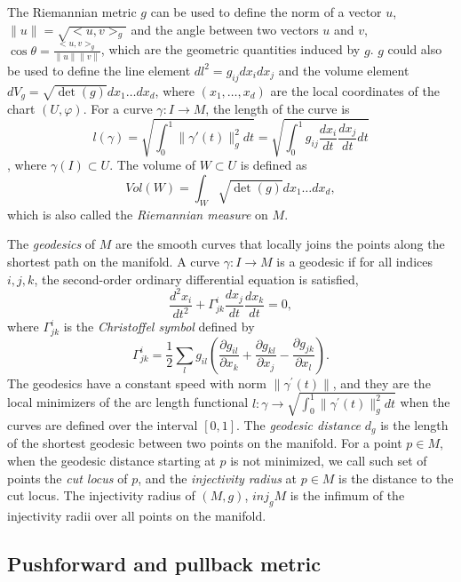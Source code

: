 \documentclass[11pt,a4paper,]{article}
\begin{document}
The Riemannian metric \(g\) can be used to define the norm of a vector
\(u\), \(\|u\| = \sqrt{<u,v>_g}\) and the angle between two vectors \(u\) and
\(v\), \(\cos\theta = \frac{<u,v>_g}{\|u\| \|v\|}\), which are the geometric
quantities induced by \(g\). \(g\) could also be used to define the line
element \(dl^2 = g_{ij}dx_idx_j\) and the volume element
\(dV_g = \sqrt{\det(g)}dx_1\dots dx_d\), where \((x_1,\dots,x_d)\) are the
local coordinates of the chart \((U, \varphi)\). For a curve
\(\gamma: I \rightarrow M\), the length of the curve is
\[l(\gamma) = \sqrt{\int_0^1 \|\gamma\prime(t)\|^2_g dt} = \sqrt{\int_0^1 g_{ij} \frac{dx_i}{dt} \frac{dx_j}{dt} dt}\],
where \(\gamma(I) \subset U\). The volume of \(W \subset U\) is defined as
\[
Vol(W) = \int_W \sqrt{\det(g)}dx_1 \dots dx_d,
\] which is also called the \emph{Riemannian measure} on \(M\).

The \emph{geodesics} of \(M\) are the smooth curves that locally joins the
points along the shortest path on the manifold. A curve
\(\gamma: I \rightarrow M\) is a geodesic if for all indices \(i,j,k\), the
second-order ordinary differential equation is satisfied, \[
\frac{d^2 x_i}{dt^2} + \Gamma^i_{jk} \frac{d x_j}{dt} \frac{dx_k}{dt} = 0,
\] where \(\Gamma^i_{jk}\) is the \emph{Christoffel symbol} defined by \[
\Gamma^i_{jk} = \frac{1}{2} \sum_l g_{il} (\frac{\partial g_{il}}{\partial x_k} 
+ \frac{\partial g_{kl}}{\partial x_j} - \frac{\partial g_{jk}}{\partial x_l}).
\] The geodesics have a constant speed with norm
\(\| \gamma^\prime(t) \|\), and they are the local minimizers of the arc
length functional
\(l:\gamma \rightarrow \sqrt{\int_0^1 \| \gamma^\prime(t) \|_g^2 dt}\)
when the curves are defined over the interval \([0,1]\). The \emph{geodesic
distance} \(d_g\) is the length of the shortest geodesic between two
points on the manifold. For a point \(p \in M\), when the geodesic
distance starting at \(p\) is not minimized, we call such set of points
the \emph{cut locus} of \(p\), and the \emph{injectivity radius} at \(p \in M\) is the
distance to the cut locus. The injectivity radius of \((M,g)\),
\(\textit{inj}_gM\) is the infimum of the injectivity radii over all
points on the manifold.

\hypertarget{pushforward-and-pullback-metric}{%
\subsection{Pushforward and pullback metric}\label{pushforward-and-pullback-metric}}
\end{document}
